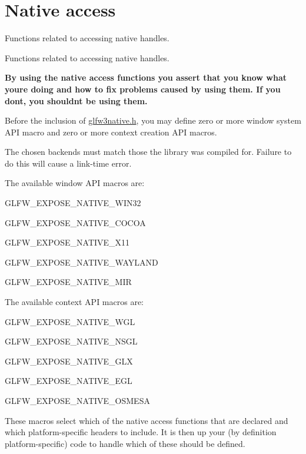 \hypertarget{group__native}{}\section{Native access}
\label{group__native}


Functions related to accessing native handles.  


Functions related to accessing native handles. 

{\bfseries{By using the native access functions you assert that you know what you\textquotesingle{}re doing and how to fix problems caused by using them. If you don\textquotesingle{}t, you shouldn\textquotesingle{}t be using them.}}

Before the inclusion of \mbox{\hyperlink{glfw3native_8h}{glfw3native.\+h}}, you may define zero or more window system A\+PI macro and zero or more context creation A\+PI macros.

The chosen backends must match those the library was compiled for. Failure to do this will cause a link-\/time error.

The available window A\+PI macros are\+:
\begin{DoxyItemize}
\item {\ttfamily G\+L\+F\+W\+\_\+\+E\+X\+P\+O\+S\+E\+\_\+\+N\+A\+T\+I\+V\+E\+\_\+\+W\+I\+N32}
\item {\ttfamily G\+L\+F\+W\+\_\+\+E\+X\+P\+O\+S\+E\+\_\+\+N\+A\+T\+I\+V\+E\+\_\+\+C\+O\+C\+OA}
\item {\ttfamily G\+L\+F\+W\+\_\+\+E\+X\+P\+O\+S\+E\+\_\+\+N\+A\+T\+I\+V\+E\+\_\+\+X11}
\item {\ttfamily G\+L\+F\+W\+\_\+\+E\+X\+P\+O\+S\+E\+\_\+\+N\+A\+T\+I\+V\+E\+\_\+\+W\+A\+Y\+L\+A\+ND}
\item {\ttfamily G\+L\+F\+W\+\_\+\+E\+X\+P\+O\+S\+E\+\_\+\+N\+A\+T\+I\+V\+E\+\_\+\+M\+IR}
\end{DoxyItemize}

The available context A\+PI macros are\+:
\begin{DoxyItemize}
\item {\ttfamily G\+L\+F\+W\+\_\+\+E\+X\+P\+O\+S\+E\+\_\+\+N\+A\+T\+I\+V\+E\+\_\+\+W\+GL}
\item {\ttfamily G\+L\+F\+W\+\_\+\+E\+X\+P\+O\+S\+E\+\_\+\+N\+A\+T\+I\+V\+E\+\_\+\+N\+S\+GL}
\item {\ttfamily G\+L\+F\+W\+\_\+\+E\+X\+P\+O\+S\+E\+\_\+\+N\+A\+T\+I\+V\+E\+\_\+\+G\+LX}
\item {\ttfamily G\+L\+F\+W\+\_\+\+E\+X\+P\+O\+S\+E\+\_\+\+N\+A\+T\+I\+V\+E\+\_\+\+E\+GL}
\item {\ttfamily G\+L\+F\+W\+\_\+\+E\+X\+P\+O\+S\+E\+\_\+\+N\+A\+T\+I\+V\+E\+\_\+\+O\+S\+M\+E\+SA}
\end{DoxyItemize}

These macros select which of the native access functions that are declared and which platform-\/specific headers to include. It is then up your (by definition platform-\/specific) code to handle which of these should be defined. 
